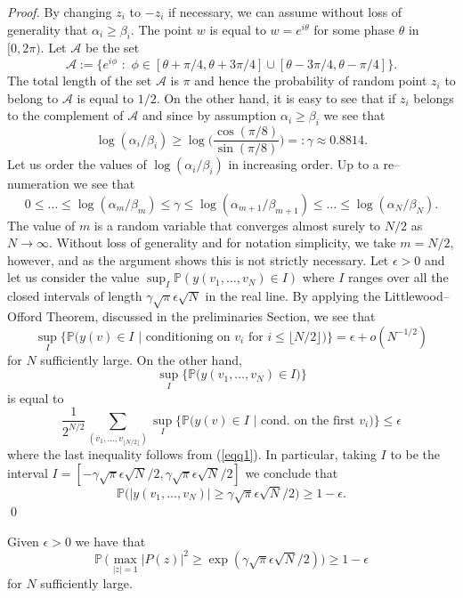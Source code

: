 \documentclass[smallextended]{svjour3}
\begin{document}
\begin{proof}
By changing $z_i$ to $-z_i$ if necessary, we can assume without loss of generality that $\alpha_i\geq\beta_i$. The point $w$ is equal to $w=e^{i\theta}$ for some phase $\theta$ in $[0,2\pi)$. Let $\mathcal{A}$ be the set 
$$
\mathcal{A}:=\Big\{e^{i\phi}\,\,:\,\,\phi\in [\theta+\pi/4,\theta+3\pi/4]\cup [\theta-3\pi/4,\theta-\pi/4]\Big\}.
$$
The total length of the set $\mathcal{A}$ is $\pi$ and hence the probability of random point $z_{i}$ to belong to $\mathcal{A}$ is equal to $1/2$. On the other hand, it is easy to see that if $z_i$ belongs to the complement of $\mathcal{A}$ and since by assumption $\alpha_i\geq \beta_i$ we see that 
$$
\log(\alpha_i/\beta_i)\geq \log\Bigg(\frac{\cos(\pi/8)}{\sin(\pi/8)}\Bigg)=:\gamma \approx 0.8814.
$$ 
Let us order the values of $\log(\alpha_i/\beta_i)$ in increasing order. Up to a re--numeration we see that 
$$
0 \leq\ldots\leq \log(\alpha_{m}/\beta_{m})\leq  \gamma \leq \log(\alpha_{m+1}/\beta_{m+1})\leq\ldots\leq \log(\alpha_N/\beta_N).
$$
The value of $m$ is a random variable that converges almost surely to $N/2$ as $N\to\infty$. Without loss of generality and for notation simplicity, we take $m=N/2$, however, and as the argument shows this is not strictly necessary. Let $\epsilon>0$ and let us consider the value $\sup_{I}{\mathbb{P}(y(v_1,\ldots,v_N)\in I)}$ where $I$ ranges over all the closed intervals of length $\gamma\sqrt{\pi}\epsilon\sqrt{N}$ in the real line. By applying the Littlewood--Offord Theorem, discussed in the preliminaries Section, we see that
\begin{equation}\label{eqq1}
\sup_{I}\Big\{\mathbb{P}\Big(y(v)\in I\,\,|\,\,\text{conditioning on $v_{i}$ for $i\leq \lfloor N/2 \rfloor$}\Big)\Big\} = \epsilon + o(N^{-1/2}) 
\end{equation}
for $N$ sufficiently large. On the other hand,
$$
\sup_{I}\Big\{\mathbb{P}\big(y(v_1,\ldots,v_N)\in I\big)\Big\}
$$
is equal to 
$$
\frac{1}{2^{N/2}}\sum_{(v_{1},\ldots,v_{\lfloor N/2 \rfloor})}{\sup_{I}\Big\{\mathbb{P}\Big(y(v)\in I\,\,|\,\,\text{cond. on the first $v_{i}$}\Big)\Big\}}\leq\epsilon
$$
where the last inequality follows from (\ref{eqq1}). In particular, taking $I$ to be the interval $I =[-\gamma\sqrt{\pi}\epsilon\sqrt{N}/2, \gamma\sqrt{\pi}\epsilon\sqrt{N}/2]$ we conclude that
$$
\mathbb{P}\Big(|y(v_1,\ldots,v_N)|\geq \gamma \sqrt{\pi}\epsilon\sqrt{N}/2\Big)\geq 1-\epsilon.
$$
\qed \end{proof}

\begin{theorem}\label{randpoly}
Given $\epsilon>0$ we have that
\begin{equation}
\mathbb{P}\,\Big(\max_{|z|=1}|P(z)|^2\geq \exp(\gamma\sqrt{\pi}\epsilon\sqrt{N}/2)\Big)\geq 1-\epsilon
\end{equation}
for $N$ sufficiently large.
\end{theorem}
\end{document}
